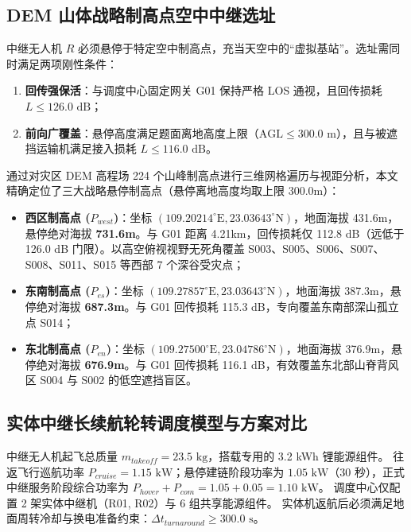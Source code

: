 \subsection{DEM 山体战略制高点空中中继选址}

中继无人机 $R$ 必须悬停于特定空中制高点，充当天空中的“虚拟基站”。选址需同时满足两项刚性条件：
\begin{enumerate}
    \item \textbf{回传强保活}：与调度中心固定网关 G01 保持严格 LOS 通视，且回传损耗 $L \le 126.0\text{ dB}$；
    \item \textbf{前向广覆盖}：悬停高度满足题面离地高度上限（$\text{AGL} \le 300.0\text{ m}$），且与被遮挡运输机满足接入损耗 $L \le 116.0\text{ dB}$。
\end{enumerate}

通过对灾区 DEM 高程场 224 个山峰制高点进行三维网格遍历与视距分析，本文精确定位了三大战略悬停制高点（悬停离地高度均取上限 300.0m）：
\begin{itemize}
    \item \textbf{西区制高点 ($P_{west}$)}：坐标 $(109.20214^\circ\text{E}, 23.03643^\circ\text{N})$，地面海拔 431.6m，悬停绝对海拔 \textbf{731.6m}。与 G01 距离 4.21km，回传损耗仅 112.8 dB（远低于 126.0 dB 门限）。以高空俯视视野无死角覆盖 S003、S005、S006、S007、S008、S011、S015 等西部 7 个深谷受灾点；
    \item \textbf{东南制高点 ($P_{es}$)}：坐标 $(109.27857^\circ\text{E}, 23.03643^\circ\text{N})$，地面海拔 387.3m，悬停绝对海拔 \textbf{687.3m}。与 G01 回传损耗 115.3 dB，专向覆盖东南部深山孤立点 S014；
    \item \textbf{东北制高点 ($P_{en}$)}：坐标 $(109.27500^\circ\text{E}, 23.04786^\circ\text{N})$，地面海拔 376.9m，悬停绝对海拔 \textbf{676.9m}。与 G01 回传损耗 116.1 dB，有效覆盖东北部山脊背风区 S004 与 S002 的低空遮挡盲区。
\end{itemize}

\subsection{实体中继长续航轮转调度模型与方案对比}

中继无人机起飞总质量 $m_{takeoff} = 23.5\text{ kg}$，搭载专用的 3.2 kWh 锂能源组件。
往返飞行巡航功率 $P_{cruise} = 1.15\text{ kW}$；悬停建链阶段功率为 $1.05\text{ kW}$（30 秒），正式中继服务阶段综合功率为 $P_{hover} + P_{com} = 1.05 + 0.05 = 1.10\text{ kW}$。
调度中心仅配置 2 架实体中继机（R01, R02）与 6 组共享能源组件。
实体机返航后必须满足地面周转冷却与换电准备约束：$\Delta t_{turnaround} \ge 300.0\text{ s}$。

